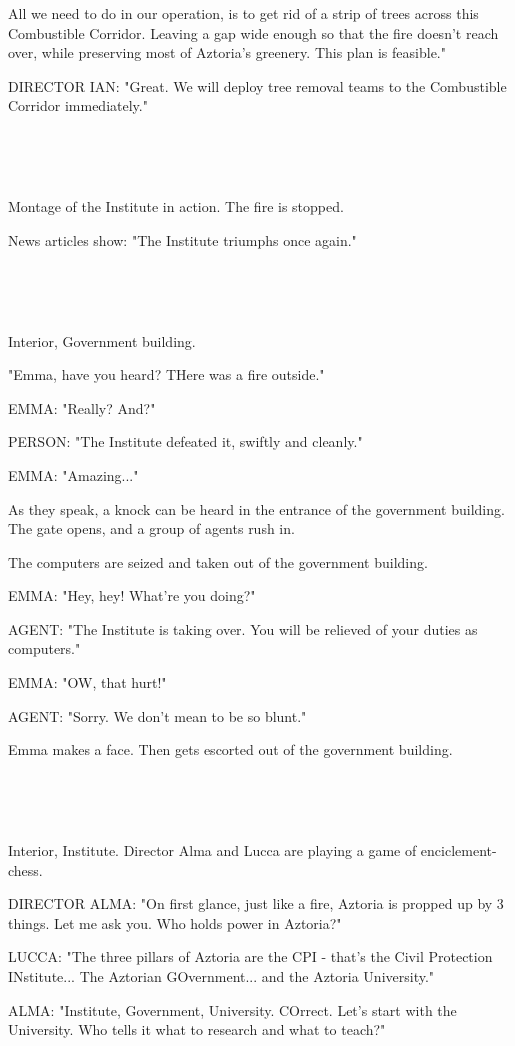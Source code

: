 \documentclass[11pt]{article}
\begin{document}
All we need to do in our operation, is to get rid of a strip of trees across this Combustible Corridor.
Leaving a gap wide enough so that the fire doesn't reach over, while preserving most of Aztoria's greenery.
This plan is feasible."

DIRECTOR IAN: "Great. We will deploy tree removal teams to the Combustible Corridor immediately."

\ 

\ 

Montage of the Institute in action.
The fire is stopped.

News articles show: "The Institute triumphs once again."

\ 

\ 

Interior, Government building.

"Emma, have you heard? THere was a fire outside."

EMMA: "Really? And?"

PERSON: "The Institute defeated it, swiftly and cleanly."

EMMA: "Amazing..."

As they speak, a knock can be heard in the entrance of the government building.
The gate opens, and a group of agents rush in.

The computers are seized and taken out of the government building.

EMMA: "Hey, hey! What're you doing?"

AGENT: "The Institute is taking over. 
You will be relieved of your duties as computers."

EMMA: "OW, that hurt!"

AGENT: "Sorry. We don't mean to be so blunt."

Emma makes a face. Then gets escorted out of the government building.

\ 

\ 

Interior, Institute.
Director Alma and Lucca are playing a game of enciclement-chess.

DIRECTOR ALMA: "On first glance, just like a fire, Aztoria is propped up by 3 things.
Let me ask you. 
Who holds power in Aztoria?"

LUCCA: "The three pillars of Aztoria are the CPI - that's the Civil Protection INstitute... The Aztorian GOvernment... and the Aztoria University."

ALMA: "Institute, Government, University. COrrect.
Let's start with the University.
Who tells it what to research and what to teach?"
\end{document}
